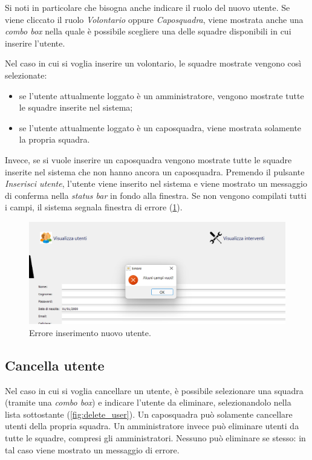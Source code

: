 Si noti in particolare che bisogna anche indicare il ruolo del nuovo utente. Se viene cliccato il ruolo \textit{Volontario} oppure \textit{Caposquadra}, viene mostrata anche una \textit{combo box} nella quale è possibile scegliere una delle squadre disponibili in cui inserire l'utente.

Nel caso in cui si voglia inserire un volontario, le squadre mostrate vengono così selezionate: 
\begin{itemize}
	\item se l'utente attualmente loggato è un amministratore, vengono mostrate tutte le squadre inserite nel sistema;
	\item se l'utente attualmente loggato è un caposquadra, viene mostrata solamente la propria squadra.
\end{itemize}
Invece, se si vuole inserire un caposquadra vengono mostrate tutte le squadre inserite nel sistema che non hanno ancora un caposquadra.
Premendo il pulsante \textit{Inserisci utente}, l'utente viene inserito nel sistema e viene mostrato un messaggio di conferma nella \textit{status bar} in fondo alla finestra. Se non vengono compilati tutti i campi, il sistema segnala finestra di errore (\Fig\ref{fig:new_user_error}). 

\begin{figure}[h!]
	\centering
	\includegraphics[width=0.9\linewidth]{./ImageFiles/new_user_error}
	\caption{Errore inserimento nuovo utente.}
	\label{fig:new_user_error}
\end{figure}

\subsection{Cancella utente}
Nel caso in cui si voglia cancellare un utente, è possibile selezionare una squadra (tramite una \textit{combo box}) e indicare l'utente da eliminare, selezionandolo nella lista sottostante (\Fig\ref{fig:delete_user}). Un caposquadra può solamente cancellare utenti della propria squadra. Un amministratore invece può eliminare utenti da tutte le squadre, compresi gli amministratori. Nessuno può eliminare se stesso: in tal caso viene mostrato un messaggio di errore.

